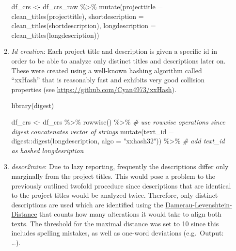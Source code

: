 \documentclass[
]{article}
\newenvironment{Shaded}{\begin{snugshade}}{\end{snugshade}}
\newcommand{\AttributeTok}[1]{\textcolor[rgb]{0.77,0.63,0.00}{#1}}
\newcommand{\CommentTok}[1]{\textcolor[rgb]{0.56,0.35,0.01}{\textit{#1}}}
\newcommand{\FunctionTok}[1]{\textcolor[rgb]{0.00,0.00,0.00}{#1}}
\newcommand{\NormalTok}[1]{#1}
\newcommand{\OtherTok}[1]{\textcolor[rgb]{0.56,0.35,0.01}{#1}}
\newcommand{\SpecialCharTok}[1]{\textcolor[rgb]{0.00,0.00,0.00}{#1}}
\newcommand{\StringTok}[1]{\textcolor[rgb]{0.31,0.60,0.02}{#1}}
\begin{document}
\begin{enumerate}
\begin{enumerate}
\begin{Shaded}
\begin{Highlighting}[]
\NormalTok{df\_crs }\OtherTok{\textless{}{-}}\NormalTok{ df\_crs\_raw }\SpecialCharTok{\%\textgreater{}\%}
  \FunctionTok{mutate}\NormalTok{(}\AttributeTok{projecttitle =} \FunctionTok{clean\_titles}\NormalTok{(projecttitle),}
         \AttributeTok{shortdescription =} \FunctionTok{clean\_titles}\NormalTok{(shortdescription),}
         \AttributeTok{longdescription =} \FunctionTok{clean\_titles}\NormalTok{(longdescription))}
\end{Highlighting}
\end{Shaded}
  \item
    \emph{Id creation}: Each project title and description is given a specific id in order to be able to analyze only distinct titles and descriptions later on. These were created using a well-known hashing algorithm called ``xxHash'' that is reasonably fast and exhibits very good collision properties (see \url{https://github.com/Cyan4973/xxHash}).

\begin{Shaded}
\begin{Highlighting}[]
\FunctionTok{library}\NormalTok{(digest)}

\NormalTok{df\_crs }\OtherTok{\textless{}{-}}\NormalTok{ df\_crs }\SpecialCharTok{\%\textgreater{}\%}
  \FunctionTok{rowwise}\NormalTok{() }\SpecialCharTok{\%\textgreater{}\%} \CommentTok{\# use rowwise operations since digest concatenates vector of strings}
  \FunctionTok{mutate}\NormalTok{(}\AttributeTok{text\_id =}\NormalTok{ digest}\SpecialCharTok{::}\FunctionTok{digest}\NormalTok{(longdescription, }\AttributeTok{algo =} \StringTok{"xxhash32"}\NormalTok{)) }\SpecialCharTok{\%\textgreater{}\%} \CommentTok{\# add text\_id as hashed longdesription}
\end{Highlighting}
\end{Shaded}
  \item
    \emph{descr2mine}: Due to lazy reporting, frequently the descriptions differ only marginally from the project titles. This would pose a problem to the previously outlined twofold procedure since descriptions that are identical to the project titles would be analyzed twice. Therefore, only distinct descriptions are used which are identified using the \href{https://en.wikipedia.org/wiki/Damerau\%E2\%80\%93Levenshtein_distance}{Damerau-Levenshtein-Distance} that counts how many alterations it would take to align both texts. The threshold for the maximal distance was set to 10 since this includes spelling mistakes, as well as one-word deviations (e.g.~Output: \ldots).


\end{enumerate}
\end{enumerate}
\end{document}
